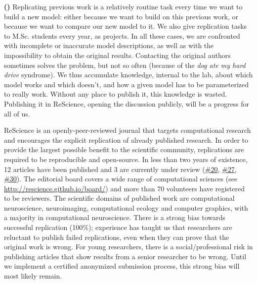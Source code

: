 \documentclass[a4paper,10pt, twocolumn]{article}
\begin{document}
\begin{tcolorbox}[breakable, pad at break*=1mm,
                  colback=black!2.5, arc=0pt, outer arc=0pt, boxrule=.25pt]
\begin{footnotesize}
\textbf{(\cite{viejo:2016})} Replicating previous work is a relatively routine
task every time we want to build a new model: either because we want to build
on this previous work, or because we want to compare our new model to it. We also give replication tasks to
M.Sc. students every year, as projects. In all these cases, we are confronted
with incomplete or inaccurate model descriptions, as well as with the impossibility
to obtain the original results. Contacting the original authors sometimes
solves the problem, but not so often (because of the {\em dog ate my hard
  drive} syndrome). We thus accumulate knowledge, internal to the lab, about
which model works and which doesn't, and how a given model has to be parameterized
to really work. Without any place to publish it, this knowledge is
wasted. Publishing it in ReScience, opening the discussion publicly, will be a
progress for all of us. \par
\end{footnotesize}
\end{tcolorbox}

ReScience is an openly-peer-reviewed journal that targets computational research
and encourages the explicit replication of already published research. In order
to provide the largest possible benefit to the scientific community, replications are
required to be reproducible and open-source. In less than two years of existence, 12
articles have been published and 3 are currently under review
(\href{https://github.com/ReScience/ReScience-submission/pull/20}{\#20},
\href{https://github.com/ReScience/ReScience-submission/pull/27}{\#27},
\href{https://github.com/ReScience/ReScience-submission/pull/30}{\#30}). The
editorial board covers a wide range of computational sciences (see
\url{http://rescience.github.io/board/}) and more than 70 volunteers have registered to be reviewers. The scientific domains of published work
are computational neuroscience, neuroimaging, computational ecology and
computer graphics, with a majority in computational neuroscience. There is a
strong bias towards successful replication (100\%); experience has
taught us that researchers are reluctant to publish failed replications, even when they can prove that the original work is wrong. For young researchers,
there is a social/professional risk in publishing articles that show
results from a senior researcher to be wrong. Until we implement a
certified anonymized submission process, this strong bias will most likely
remain.\\
\end{document}
